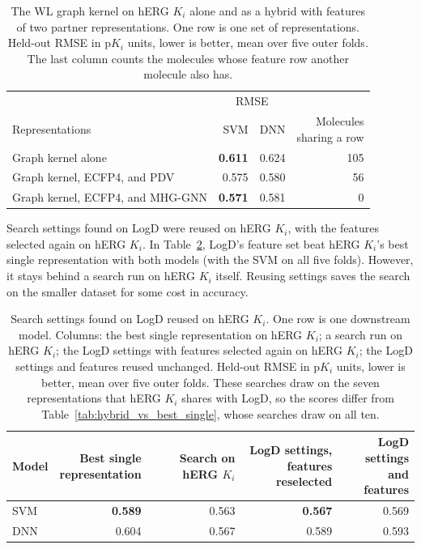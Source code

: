 \begin{table}[htbp]
\centering
\begin{tabular}{@{}lrrr@{}}
\toprule
& \multicolumn{2}{c}{RMSE} & \\
\cmidrule(lr){2-3}
Representations & SVM & DNN & \makecell[r]{Molecules\\sharing a row} \\
\midrule
Graph kernel alone & \textbf{0.611} & 0.624 & 105 \\
Graph kernel, ECFP4, and PDV & 0.575 & 0.580 & 56 \\
Graph kernel, ECFP4, and MHG-GNN & \textbf{0.571} & 0.581 & 0 \\
\bottomrule
\end{tabular}
\caption[Graph kernel on hERG $K_i$ with and without added features.]{The WL graph kernel on hERG $K_i$ alone and as a hybrid with features of two partner representations. One row is one set of representations. Held-out RMSE in p$K_i$ units, lower is better, mean over five outer folds. The last column counts the molecules whose feature row another molecule also has.}
\label{tab:method:shared_rows}
\end{table}

Search settings found on LogD were reused on hERG $K_i$, with the features selected again on hERG $K_i$. In Table~\ref{tab:method:settings_transfer}, LogD's feature set beat hERG $K_i$'s best single representation with both models (with the SVM on all five folds). However, it stays behind a search run on hERG $K_i$ itself. Reusing settings saves the search on the smaller dataset for some cost in accuracy.


\begin{table}[htbp]
\centering
\begin{tabular}{@{}lrrrr@{}}
\toprule
Model & \makecell[r]{Best single\\representation} & \makecell[r]{Search on\\hERG $K_i$} & \makecell[r]{LogD settings,\\features reselected} & \makecell[r]{LogD settings\\and features} \\
\midrule
SVM & \textbf{0.589} & 0.563 & \textbf{0.567} & 0.569 \\
DNN & 0.604 & 0.567 & 0.589 & 0.593 \\
\bottomrule
\end{tabular}
\caption[Search settings found on LogD reused on hERG $K_i$.]{Search settings found on LogD reused on hERG $K_i$. One row is one downstream model. Columns: the best single representation on hERG $K_i$; a search run on hERG $K_i$; the LogD settings with features selected again on hERG $K_i$; the LogD settings and features reused unchanged. Held-out RMSE in p$K_i$ units, lower is better, mean over five outer folds. These searches draw on the seven representations that hERG $K_i$ shares with LogD, so the scores differ from Table~\ref{tab:hybrid_vs_best_single}, whose searches draw on all ten.}
\label{tab:method:settings_transfer}
\end{table}

